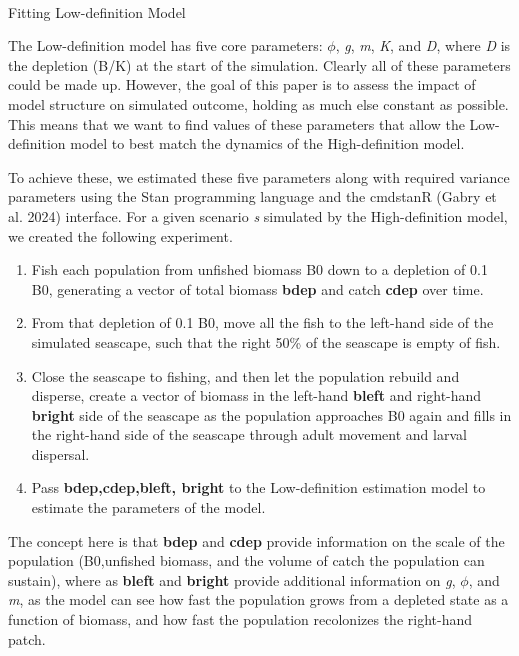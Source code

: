 \documentclass[
  default,
  lineno,
  referee]{sn-jnl}
\makeatletter
\let\oldparagraph\paragraph
\renewcommand{\paragraph}{
    \@ifstar
      \xxxParagraphStar
      \xxxParagraphNoStar
  }
\newcommand{\xxxParagraphStar}[1]{\oldparagraph*{#1}\mbox{}}
\newcommand{\xxxParagraphNoStar}[1]{\oldparagraph{#1}\mbox{}}
\providecommand{\tightlist}{%
  \setlength{\itemsep}{0pt}\setlength{\parskip}{0pt}}\usepackage{longtable,booktabs,array}
\makeatother
\begin{document}
\paragraph{Fitting Low-definition
Model}\label{fitting-low-definition-model}

The Low-definition model has five core parameters: \(\phi\), \emph{g},
\emph{m}, \emph{K}, and \emph{D}, where \emph{D} is the depletion (B/K)
at the start of the simulation. Clearly all of these parameters could be
made up. However, the goal of this paper is to assess the impact of
model structure on simulated outcome, holding as much else constant as
possible. This means that we want to find values of these parameters
that allow the Low-definition model to best match the dynamics of the
High-definition model.

To achieve these, we estimated these five parameters along with required
variance parameters using the Stan programming language and the cmdstanR
(Gabry et al. 2024) interface. For a given scenario \emph{s} simulated
by the High-definition model, we created the following experiment.

\begin{enumerate}
\def\labelenumi{\arabic{enumi}.}
\tightlist
\item
  Fish each population from unfished biomass B0 down to a depletion of
  0.1 B0, generating a vector of total biomass \textbf{bdep} and catch
  \textbf{cdep} over time.
\item
  From that depletion of 0.1 B0, move all the fish to the left-hand side
  of the simulated seascape, such that the right 50\% of the seascape is
  empty of fish.
\item
  Close the seascape to fishing, and then let the population rebuild and
  disperse, create a vector of biomass in the left-hand \textbf{bleft}
  and right-hand \textbf{bright} side of the seascape as the population
  approaches B0 again and fills in the right-hand side of the seascape
  through adult movement and larval dispersal.
\item
  Pass \textbf{bdep,cdep,bleft, bright} to the Low-definition estimation
  model to estimate the parameters of the model.
\end{enumerate}

The concept here is that \textbf{bdep} and \textbf{cdep} provide
information on the scale of the population (B0,unfished biomass, and the
volume of catch the population can sustain), where as \textbf{bleft} and
\textbf{bright} provide additional information on \emph{g}, \(\phi\),
and \emph{m}, as the model can see how fast the population grows from a
depleted state as a function of biomass, and how fast the population
recolonizes the right-hand patch.
\end{document}
